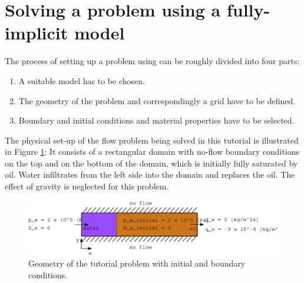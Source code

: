 \section[Fully-Implicit Model]{Solving a problem using a fully-implicit model}
\label{tutorial-coupled}

The process of setting up a problem using \eWoms can be roughly
divided into four parts:
\begin{enumerate}
\item A suitable model has to be chosen.
\item The geometry of the problem and correspondingly a grid have to
  be defined.
\item Boundary and initial conditions and material properties have to be
  selected.
\end{enumerate}

The physical set-up of the flow problem being solved in this tutorial
is illustrated in Figure \ref{tutorial-coupled:problemfigure}: It
consists of a rectangular domain with no-flow boundary conditions on
the top and on the bottom of the domain, which is initially fully
saturated by oil. Water infiltrates from the left side into the domain
and replaces the oil. The effect of gravity is neglected for this
problem.

\begin{figure}[ht]
\centering
\includegraphics[width=0.9\linewidth,keepaspectratio]{EPS/tutorial-problemconfiguration}
\caption{Geometry of the tutorial problem with initial and boundary conditions.}\label{tutorial-coupled:problemfigure}
\end{figure}

